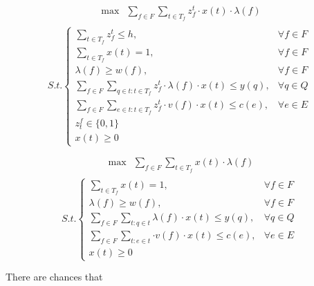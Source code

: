 \begin{equation*}
    \begin{aligned}
    \max \ \ \sum_{f \in F}\sum_{t \in T_f}{z_f^t \cdot x(t) \cdot \lambda(f)} \\
    \end{aligned}
	\end{equation*}
	\begin{equation}\label{eq:profit}
	S.t.\begin{cases}
    \sum_{t \in T_f}z_f^t \le h, & \forall f \in F \\
     \sum_{t \in T_f} x(t) = 1, & \forall f \in F \\
     \lambda(f) \ge w(f), & \forall f \in F \\
     \sum_{f \in F}\sum_{q \in t:t \in T_f}{z_f^t \cdot \lambda(f) \cdot x(t)} \le y(q), & \forall q \in Q \\
     \sum_{f \in F}\sum_{e \in t:t \in T_f}{z_f^t \cdot v(f) \cdot x(t)} \le c(e), & \forall e \in E \\
     z^f_t \in \{0,1\} \\
     x(t) \ge 0

	\end{cases}
\end{equation}


\begin{equation*}
    \begin{aligned}
    \max \ \ \sum_{f \in F}\sum_{t \in T_f}{x(t) \cdot \lambda(f)} \\
    \end{aligned}
	\end{equation*}
	\begin{equation}\label{eq:profit}
	S.t.\begin{cases}
     \sum_{t \in T_f} x(t) = 1, & \forall f \in F \\
     \lambda(f) \ge w(f), & \forall f \in F \\
     \sum_{f \in F}\sum_{t:q \in t}{\lambda(f) \cdot x(t)} \le y(q), & \forall q \in Q \\
     \sum_{f \in F}\sum_{t:e \in t}{\cdot v(f) \cdot x(t)} \le c(e), & \forall e \in E \\
     x(t) \ge 0

	\end{cases}
\end{equation}


There are chances that 
